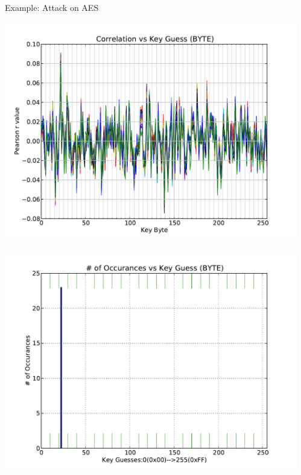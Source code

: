 \documentclass[xcolor=pdftex,dvipsnames,table,final]{beamer}
\begin{document}
\begin{frame}[fragile]{}
\begin{columns}[t]
\begin{column}{.31\linewidth}
\begin{block}{Example: Attack on AES}
        \begin{minipage}[t]{0.49\linewidth}
           \includegraphics[width=1.0\linewidth]{../figures/pearsonsCoActual}
        \end{minipage}%
        \begin{minipage}[t]{0.49\linewidth}  
		\includegraphics[width=1.0\linewidth]{../figures/histPearsonsCoActual}
        \end{minipage}
        \vspace{-3.8ex}
       \end{block}
          
    \end{column}
   \begin{column}{.31\linewidth}
    


\end{column}
\end{columns}
\end{frame}
\end{document}
